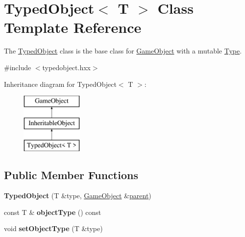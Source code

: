 \hypertarget{class_typed_object}{\section{\-Typed\-Object$<$ \-T $>$ \-Class \-Template \-Reference}
\label{class_typed_object}
}


\-The \hyperlink{class_typed_object}{\-Typed\-Object} class is the base class for \hyperlink{class_game_object}{\-Game\-Object} with a mutable \hyperlink{class_type}{\-Type}.  




{\ttfamily \#include $<$typedobject.\-hxx$>$}

\-Inheritance diagram for \-Typed\-Object$<$ \-T $>$\-:\begin{figure}[H]
\begin{center}
\leavevmode
\includegraphics[height=3.000000cm]{class_typed_object}
\end{center}
\end{figure}
\subsection*{\-Public \-Member \-Functions}
\begin{DoxyCompactItemize}
\item 
\hypertarget{class_typed_object_a10319b334d59e8c51a05f56b37001381}{{\bfseries \-Typed\-Object} (\-T \&type, \hyperlink{class_game_object}{\-Game\-Object} \&\hyperlink{class_game_object_af3deaf39cde23c189765634e32e95bb4}{parent})}\label{class_typed_object_a10319b334d59e8c51a05f56b37001381}

\item 
\hypertarget{class_typed_object_a04c82b45381b20f0223452a43eabfeec}{const \-T \& {\bfseries object\-Type} () const }\label{class_typed_object_a04c82b45381b20f0223452a43eabfeec}

\item 
\hypertarget{class_typed_object_a0ece67a4e69c1cb1c127e2316236f8a3}{void {\bfseries set\-Object\-Type} (\-T \&type)}\label{class_typed_object_a0ece67a4e69c1cb1c127e2316236f8a3}

\end{DoxyCompactItemize}
